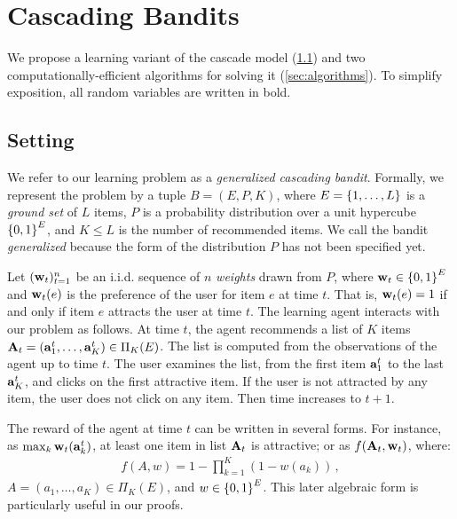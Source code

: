 
\section{Cascading Bandits}
\label{sec:cascading bandits}

We propose a learning variant of the cascade model (\cref{sec:setting}) and two computationally-efficient algorithms for solving it (\cref{sec:algorithms}). To simplify exposition, all random variables are written in bold.


\subsection{Setting}
\label{sec:setting}

We refer to our learning problem as a \emph{generalized cascading bandit}. Formally, we represent the problem by a tuple $B = (E, P, K)$, where $E = \left\{1, \dots, L\right\}$ is a \emph{ground set} of $L$ items, $P$ is a probability distribution over a unit hypercube $\left\{0, 1\right\}^E$, and $K \leq L$ is the number of recommended items. We call the bandit \emph{generalized} because the form of the distribution $P$ has not been specified yet.

Let $(\mathbf{w}_t)_{t = 1}^n$ be an i.i.d. sequence of $n$ \emph{weights} drawn from $P$, where $\mathbf{w}_t \in \left\{0, 1\right\}^E$ and $\mathbf{w}_t(e)$ is the preference of the user for item $e$ at time $t$. That is, $\mathbf{w}_t(e) = 1$ if and only if item $e$ attracts the user at time $t$. The learning agent interacts with our problem as follows. At time $t$, the agent recommends a list of $K$ items $\mathbf{A}_t = (\mathbf{a}^t_1, \dots, \mathbf{a}^t_K) \in \Pi_K(E)$. The list is computed from the observations of the agent up to time $t$. The user examines the list, from the first item $\mathbf{a}^t_1$ to the last $\mathbf{a}^t_K$, and clicks on the first attractive item. If the user is not attracted by any item, the user does not click on any item. Then time increases to $t + 1$.

The reward of the agent at time $t$ can be written in several forms. For instance, as $\max_k \mathbf{w}_t(\mathbf{a}^t_k)$, at least one item in list $\mathbf{A}_t$ is attractive; or as $f(\mathbf{A}_t, \mathbf{w}_t)$, where:
\begin{align*}
  f(A, w) = 1 - \prod_{k = 1}^K (1 - w(a_k))\,,
\end{align*}
$A = (a_1, \dots, a_K) \in \Pi_K(E)$, and $w \in \left\{0, 1\right\}^E$. This later algebraic form is particularly useful in our proofs.


